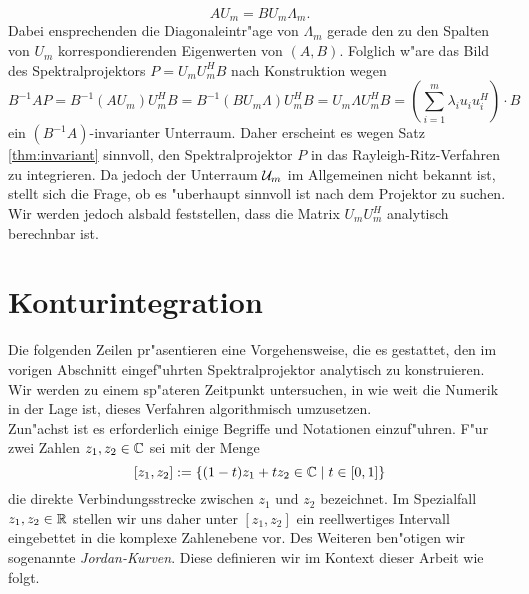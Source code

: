 \[
AU_m = BU_m\Lambda_m.
\]
Dabei ensprechenden die Diagonaleintr"age von $\Lambda_m$ gerade den zu den Spalten
von $U_m$ korrespondierenden Eigenwerten von $(A,B)$. Folglich w"are das Bild
des Spektralprojektors $P=U_m U_m^H B$ nach Konstruktion wegen
\[
B^{-1}AP = B^{-1}(AU_m)U_m^H B = B^{-1}(BU_m \Lambda)U_m^H B
= U_m\Lambda U_m^H B = \left(\sum_{i=1}^m \lambda_i u_i u_i^H\right)\cdot B
\]
ein $(B^{-1}A)$-invarianter Unterraum. Daher erscheint es
wegen Satz \ref{thm:invariant} sinnvoll, den Spektralprojektor $P$ in das
Rayleigh-Ritz-Verfahren zu integrieren.
Da jedoch der Unterraum $\mathcal{U}_m$ im Allgemeinen nicht bekannt ist, stellt sich die Frage, ob es
"uberhaupt sinnvoll ist nach dem Projektor zu suchen.
Wir werden jedoch alsbald feststellen, dass %
die Matrix $U_m U_m^H$ analytisch berechnbar ist.







\section{Konturintegration}\label{sec:kontur}

Die folgenden Zeilen pr"asentieren eine Vorgehensweise, die es gestattet, den im vorigen
Abschnitt eingef"uhrten Spektralprojektor analytisch zu konstruieren. Wir werden
zu einem sp"ateren Zeitpunkt untersuchen, in wie weit die Numerik in der Lage ist, dieses
Verfahren algorithmisch umzusetzen.\\

Zun"achst ist es erforderlich einige Begriffe und Notationen einzuf"uhren. F"ur zwei Zahlen $z_1, z_2 \in\mathbb{C}$ sei mit der Menge
\[
[z_1, z_2] := \{(1-t)z_1 + tz_2 \in\mathbb{C} \mid t\in[0,1]\}
\]
die direkte Verbindungsstrecke zwischen $z_1$ und $z_2$ bezeichnet. Im Spezialfall $z_1,z_2 \in\mathbb{R}$
stellen wir uns daher unter $[z_1,z_2]$ ein reellwertiges Intervall eingebettet in die komplexe Zahlenebene vor.
Des Weiteren ben"otigen wir sogenannte \emph{Jordan-Kurven}. Diese definieren wir im Kontext
dieser Arbeit wie folgt.


